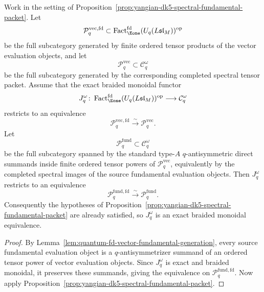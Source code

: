 \begin{proposition}
\label{prop:yangian-dk5-spectral-vector-packet}
Work in the setting of
Proposition~\ref{prop:yangian-dk5-spectral-fundamental-packet}. Let
\[
\mathcal{P}^{\mathrm{vec,fd}}_{q}
\subset
\operatorname{Fact}_{\Eone}^{\mathrm{fd}}(U_q(L\mathfrak{sl}_M))^{\mathrm{op}}
\]
be the full subcategory generated by finite ordered tensor products of
the vector evaluation objects, and
let
\[
\mathcal{P}^{\mathrm{vec}}_{q}
\subset
\mathcal{C}_q^\omega
\]
be the full subcategory generated by the corresponding completed
spectral tensor packet.
Assume that the exact braided monoidal functor
\[
J_q^\omega\colon
\operatorname{Fact}_{\Eone}^{\mathrm{fd}}(U_q(L\mathfrak{sl}_M))^{\mathrm{op}}
\longrightarrow
\mathcal{C}_q^\omega
\]
restricts to an equivalence
\[
\mathcal{P}^{\mathrm{vec,fd}}_{q}
\xrightarrow{\sim}
\mathcal{P}^{\mathrm{vec}}_{q}.
\]
Let
\[
\mathcal{P}^{\mathrm{fund}}_{q}
\subset
\mathcal{C}_q^\omega
\]
be the full subcategory spanned by the standard type-$A$
$q$-antisymmetric direct summands inside finite ordered tensor powers
of \(\mathcal{P}^{\mathrm{vec}}_{q}\), equivalently by the completed
spectral images of the source fundamental evaluation objects. Then
\(J_q^\omega\) restricts to an equivalence
\[
\mathcal{P}^{\mathrm{fund,fd}}_{q}
\xrightarrow{\sim}
\mathcal{P}^{\mathrm{fund}}_{q}.
\]
Consequently the hypotheses of
Proposition~\ref{prop:yangian-dk5-spectral-fundamental-packet} are
already satisfied, so \(J_q^\omega\) is an exact braided monoidal
equivalence.

\end{proposition}

\begin{proof}
By Lemma~\ref{lem:quantum-fd-vector-fundamental-generation}, every
source fundamental evaluation object is a $q$-antisymmetrizer summand
of an ordered tensor power of vector evaluation objects. Since
\(J_q^\omega\) is exact and braided monoidal, it preserves these
summands, giving the equivalence on
\(\mathcal{P}^{\mathrm{fund,fd}}_{q}\). Now apply
Proposition~\ref{prop:yangian-dk5-spectral-fundamental-packet}.
\end{proof}

